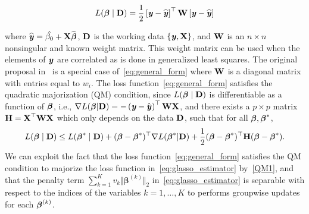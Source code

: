 \begin{equation}
L(\boldsymbol{\beta}\mid\textbf{D})=\frac{1}{2}\left[\textbf{\emph{y}}-\widehat{\textbf{\emph{y}}}\right]^{\top}\mathbf{W}\left[\textbf{\emph{y}}-\widehat{\textbf{\emph{y}}}\right] \label{eq:general_form}
\end{equation}

where $\widehat{\textbf{\emph{y}}}=\hat{\beta_0}+\textbf{X}\widehat{\boldsymbol{\beta}}$, $\textbf{D}$ is the working data $\lbrace \textbf{\emph{y}}, \textbf{X} \rbrace$, and $\textbf{W}$ is an $n \times n$ nonsingular and known weight matrix. This weight matrix can be used when the elements of $\textbf{\emph{y}}$ are correlated as is done in generalized least squares. The original proposal in~\cite{yang2015fast} is a special case of~\eqref{eq:general_form} where $\textbf{W}$ is a diagonal matrix with entries equal to $w_i$. The loss function~\eqref{eq:general_form} satisfies the quadratic majorization (QM) condition, since $L(\boldsymbol{\beta}\mid\textbf{D})$ is differentiable as a function of $\boldsymbol{\beta}$, i.e., $\nabla L(\boldsymbol{\beta}|\textbf{D})=-\left(\textbf{\emph{y}}-\hat{\textbf{\emph{y}}}\right)^{\top}\mathbf{W}\textbf{X}$, and there exists
a $p\times p$ matrix $\textbf{H}=\textbf{X}^{\top}\mathbf{W}\textbf{X}$ which only depends on the data $\textbf{D}$, such that for all $\boldsymbol{\beta},\boldsymbol{\beta}^{*}$,
\begin{equation}
L(\boldsymbol{\beta}\mid\textbf{D})\le L(\boldsymbol{\beta}^{*}\mid\textbf{D})+(\boldsymbol{\beta}-\boldsymbol{\beta}^{*})^{\top}\nabla L(\boldsymbol{\beta}^{*}|\textbf{D})+\frac{1}{2}(\boldsymbol{\beta}-\boldsymbol{\beta}^{*})^{\top}\textbf{H}(\boldsymbol{\beta}-\boldsymbol{\beta}^{*}).\label{QM1}
\end{equation}
We can exploit the fact that the loss function~\eqref{eq:general_form} satisfies the QM condition to majorize the loss function in~\eqref{eq:glasso_estimator} by~\eqref{QM1}, and that the penalty term $\sum_{k=1}^{K}v_k\Vert\boldsymbol{\beta}^{(k)}\Vert_{2}$ in~\eqref{eq:glasso_estimator} is separable with respect to the indices of the variables $k=1, \ldots, K$ to performs groupwise updates for each $\boldsymbol{\beta}^{(k)}$. 


